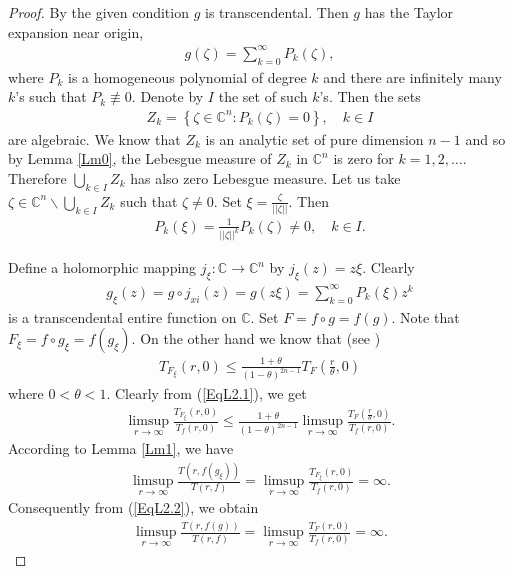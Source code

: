 \documentclass[11pt,reqno]{amsart}
\numberwithin{equation}{section}
\begin{document}
\begin{proof} By the given condition $g$ is transcendental. Then $g$ has the Taylor expansion near origin,
\begin{align*}
g(\zeta)=\sum\limits_{k=0}^{\infty} P_k(\zeta),
\end{align*}
where $P_k$ is a homogeneous polynomial of degree $k$ and there are infinitely many $k$'s 
such that $P_k\not\equiv 0$. Denote by $I$ the set of such $k$'s. Then the sets
\begin{align*}
Z_k=\left\lbrace \zeta\in\mathbb{C}^n: P_k(\zeta)=0\right\rbrace, \quad k\in I
\end{align*}
are algebraic. We know that $Z_k$ is an analytic set of pure dimension $n-1$ and so by Lemma \ref{Lm0}, the Lebesgue measure of $Z_k$ in $\mathbb{C}^n$ is zero for $k=1,2,\ldots$. Therefore $\bigcup_{k\in I} Z_k$ has also zero Lebesgue measure. Let us take $\zeta\in \mathbb{C}^n\backslash \bigcup\limits_{k\in I} Z_k$ such that $\zeta\neq 0$. Set $\xi=\frac{\zeta}{||\zeta||}$. Then
\begin{align*}
P_k(\xi)=\frac{1}{||\zeta||^k}P_k(\zeta)\neq 0,\quad k\in I.
\end{align*}

Define a holomorphic mapping $j_{\xi}:\mathbb{C}\to \mathbb{C}^n$ by $j_{\xi}(z)=z\xi$. Clearly
\begin{align*}
g_{\xi}(z)=g\circ j_{xi}(z)=g(z\xi)=\sum\limits_{k=0}^{\infty} P_k(\xi)z^k
\end{align*}
is a transcendental entire function on $\mathbb{C}$. Set $F=f\circ g=f(g)$. Note that $F_{\xi}=f\circ g_{\xi}=f(g_{\xi})$.
On the other hand we know that (see \cite[pp.19]{Stoll-1974})
\begin{align}\label{EqL2.1} 
T_{F_{\xi}}(r,0)\leq \frac{1+\theta}{(1-\theta)^{2n-1}} T_{F}\left(\frac{r}{\theta},0\right)
\end{align}
where $0<\theta<1$. Clearly from (\ref{EqL2.1}), we get
\begin{align}\label{EqL2.2} 
\limsup\limits_{r\to \infty} \frac{T_{F_{\xi}}(r,0)}{T_f(r,0)}\leq \frac{1+\theta}{(1-\theta)^{2n-1}} \limsup\limits_{r\to\infty}\frac{T_{F}\left(\frac{r}{\theta},0\right)}{T_f(r,0)}.
\end{align}
According to Lemma \ref{Lm1}, we have
\begin{align*}
\limsup\limits_{r\to \infty} \frac{T(r,f(g_{\xi}))}{T(r,f)}=\limsup\limits_{r\to \infty} \frac{T_{F_{\xi}}(r,0)}{T_f(r,0)}=\infty.
\end{align*}
Consequently from (\ref{EqL2.2}), we obtain
\begin{align*}
\limsup\limits_{r\to \infty} \frac{T(r,f(g))}{T(r,f)}=\limsup\limits_{r\to \infty} \frac{T_{F}(r,0)}{T_f(r,0)}=\infty.
\end{align*}
\end{proof}
\end{document}
